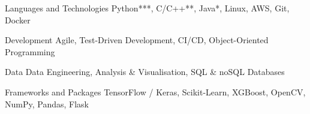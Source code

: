 \vspace{-0.1cm}

\begin{cvskills}

  \cvskill
    {Languages and Technologies}
    {Python***, C/C++**, Java*, Linux, AWS, Git, Docker}
    
  \cvskill
    {Development}
    {Agile, Test-Driven Development, CI/CD, Object-Oriented Programming}
    
  \cvskill
    {Data}
    {Data Engineering, Analysis \& Visualisation, SQL \& noSQL Databases}
    
  \cvskill
    {Frameworks and Packages}
    {TensorFlow / Keras, Scikit-Learn, XGBoost, OpenCV, NumPy, Pandas, Flask}

\end{cvskills}
